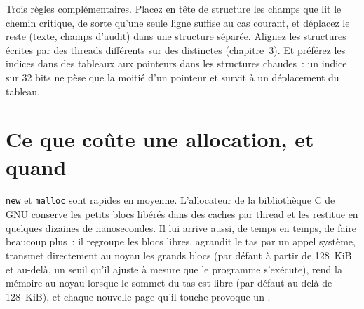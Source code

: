 \begin{omfigure}

\label{fig:ll:cpp-for-latency-i-memory:layout}
\end{omfigure}

Trois règles complémentaires. Placez en tête de structure les champs que lit le chemin critique, de sorte qu'une seule ligne suffise au
cas courant, et déplacez le reste (texte, champs d'audit) dans une structure séparée. Alignez les structures écrites par des threads différents
sur des  distinctes (chapitre~3). Et préférez les indices dans des tableaux aux pointeurs dans les structures chaudes~: un indice sur 32 bits ne pèse que la moitié d'un
pointeur et survit à un déplacement du tableau.

\section{Ce que coûte une allocation, et quand}

\texttt{new} et \texttt{malloc} sont rapides en moyenne. L'allocateur de la bibliothèque C de GNU conserve les petits blocs libérés dans des
caches par thread et les restitue en quelques dizaines de nanosecondes. Il lui arrive aussi, de temps en temps, de faire beaucoup plus~: il regroupe les
blocs libres, agrandit le tas par un appel système, transmet directement au noyau les grands blocs (par défaut à partir de 128~KiB et au-delà, un
seuil qu'il ajuste à mesure que le programme s'exécute), rend la mémoire au noyau lorsque le sommet du tas est libre (par défaut au-delà de
128~KiB), et chaque nouvelle page qu'il touche provoque un .

